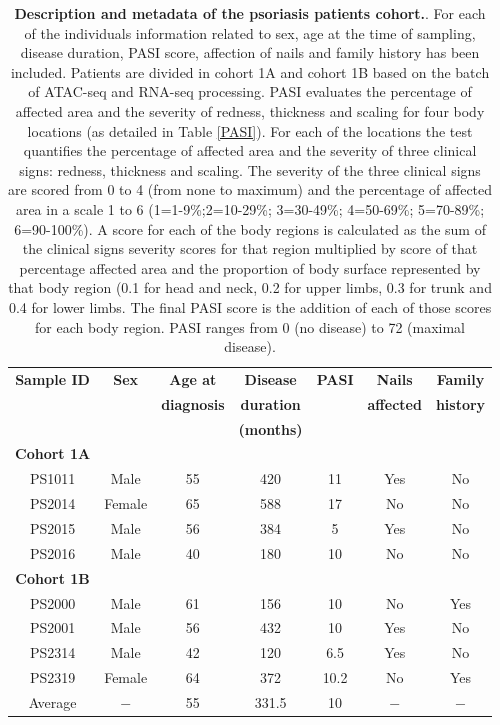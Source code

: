 		
\begin{table}[htbp]
\centering
\begin{tabular}{@{} c c c c c c c}
\toprule
\textbf{ Sample ID} & \textbf{Sex} & \textbf{Age at}    & \textbf{Disease}  & \textbf{PASI}  &\textbf{Nails}      & \textbf{Family} \\
                    &              & \textbf{diagnosis} & \textbf{duration} &                & \textbf{affected}  & \textbf{history} \\
										&							 &										&	\textbf{(months)}	&								 &                    &                  \\
\midrule
\midrule
\textbf{Cohort 1A} & & & & & & \\
\midrule
PS1011	& Male	 & 55 & 420 & 11	 & Yes	 & No \\
PS2014	& Female & 65	& 588	& 17	 & No	   & No \\
PS2015	& Male	 & 56	& 384	& 5	   & Yes   & No \\
PS2016	& Male	 & 40	& 180	& 10	 & No    & No \\
\midrule
\midrule
\textbf{Cohort 1B} & & & & & & \\
\midrule
PS2000	& Male	 & 61	& 156	& 10	 & No	   & Yes \\
PS2001	& Male	 & 56	& 432	& 10	 & Yes	 & No \\
PS2314	& Male	 & 42	& 120	& 6.5	 & Yes   & No \\
PS2319	& Female & 64	& 372	& 10.2 & No    & Yes \\
\midrule
Average		& $-$	 & 55 & 331.5 & 10 & $-$   & $-$ \\																			
\bottomrule
\end{tabular}
\medskip %
\caption[Description and metadata of the psoriasis patients cohort.]{\textbf{Description and metadata of the psoriasis patients cohort.}. For each of the individuals information related to sex, age at the time of sampling, disease duration, PASI score, affection of nails and family history has been included. Patients are divided in cohort 1A and cohort 1B based on the batch of ATAC-seq and RNA-seq processing. PASI evaluates the percentage of affected area and the severity of redness, thickness and scaling for four body locations (as detailed in Table \ref{PASI}). For each of the locations the test quantifies the percentage of affected area and the severity of three clinical signs: redness, thickness and scaling. The severity of the three clinical signs are scored from 0 to 4 (from none to maximum) and the percentage of affected area in a scale 1 to 6 (1=1-9\%;2=10-29\%; 3=30-49\%; 4=50-69\%; 5=70-89\%; 6=90-100\%). A score for each of the body regions is calculated as the sum of the clinical signs severity scores for that region multiplied by score of that percentage affected area and the proportion of body surface represented by that body region (0.1 for head and neck, 0.2 for upper limbs, 0.3 for trunk and 0.4 for lower limbs. The final PASI score is the addition of each of those scores for each body region. PASI ranges from 0 (no disease) to 72 (maximal disease).} 
\label{tab:Psoriasis_cohort_metadata}
\end{table}
